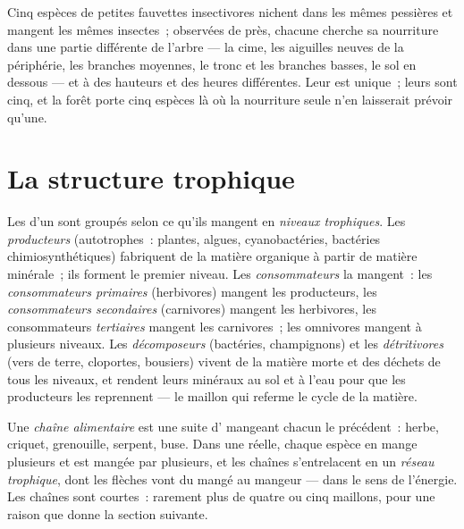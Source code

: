 \begin{example}\label{ex:b1:ecosystem-organization:warblers}
Cinq espèces de petites fauvettes insectivores nichent dans les mêmes
pessières et mangent les mêmes insectes~; observées de près, chacune
cherche sa nourriture dans une partie différente de l'arbre --- la
cime, les aiguilles neuves de la périphérie, les branches moyennes, le
tronc et les branches basses, le sol en dessous --- et à des hauteurs et
des heures différentes. Leur  est unique~; leurs  sont
cinq, et la forêt porte cinq espèces là où la nourriture seule n'en
laisserait prévoir qu'une.
\end{example}

\section{La structure trophique}

\begin{definition}\label{def:b1:ecosystem-organization:trophic}
Les  d'un  sont groupés selon ce qu'ils mangent en
\emph{niveaux trophiques}. Les \emph{producteurs} (autotrophes~:
plantes, algues, cyanobactéries, bactéries chimiosynthétiques)
fabriquent de la matière organique à partir de matière minérale~; ils
forment le premier niveau. Les \emph{consommateurs} la mangent~: les
\emph{consommateurs primaires} (herbivores) mangent les producteurs,
les \emph{consommateurs secondaires} (carnivores) mangent les
herbivores, les consommateurs \emph{tertiaires} mangent les carnivores~;
les omnivores mangent à plusieurs niveaux. Les \emph{décomposeurs}
(bactéries, champignons) et les \emph{détritivores} (vers de terre,
cloportes, bousiers) vivent de la matière morte et des déchets de tous
les niveaux, et rendent leurs minéraux au sol et à l'eau pour que les
producteurs les reprennent --- le maillon qui referme le cycle de la
matière.
\end{definition}

\begin{definition}\label{def:b1:ecosystem-organization:foodweb}
Une \emph{chaîne alimentaire} est une suite d' mangeant
chacun le précédent~: herbe, criquet, grenouille, serpent, buse. Dans
une  réelle, chaque espèce en mange plusieurs et est mangée
par plusieurs, et les chaînes s'entrelacent en un \emph{réseau
trophique}, dont les flèches vont du mangé au mangeur --- dans le sens
de l'énergie. Les chaînes sont courtes~: rarement plus de quatre ou cinq
maillons, pour une raison que donne la section suivante.
\end{definition}

